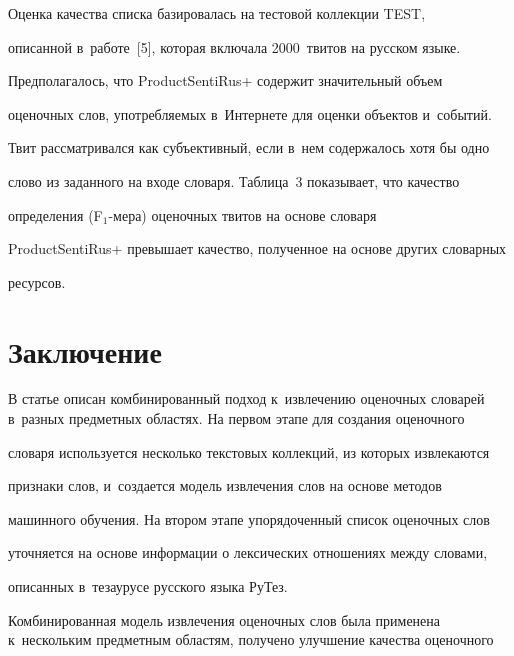  	Оценка качества списка базировалась на тестовой коллекции TEST,


описанной в~работе~[5], которая включала 2000~твитов на русском языке.


Предполагалось, что ProductSentiRus+ содержит значительный объем


оценочных слов, употребляемых в~Интернете для оценки объектов и~событий.


Твит рассматривался как субъективный, если в~нем содержалось хотя бы одно


слово из заданного на входе словаря. Таблица~3 показывает, что качество


определения (F$_1$-ме\-ра) оценочных твитов на основе словаря


ProductSentiRus+ превышает качество, полученное на основе других словарных


ресурсов.





\vspace*{-4pt}





\section{Заключение}





\vspace*{-4pt}





В статье описан комбинированный подход к~извлечению оценочных словарей в~разных предметных областях. На первом этапе для создания оценочного


словаря используется несколько текстовых коллекций, из которых извлекаются


признаки слов, и~создается модель извлечения слов на основе методов


машинного обучения. На втором этапе упорядоченный список оценочных слов


уточняется на основе информации о лексических отношениях между словами,


описанных в~тезаурусе русского языка РуТез.





	Комбинированная модель извлечения оценочных слов была применена к~нескольким предметным областям, получено улучшение качества оценочного



